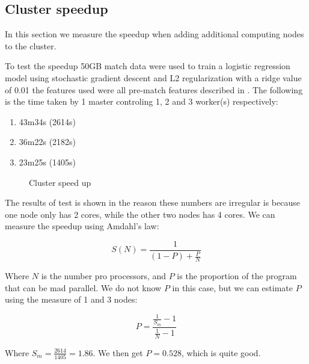 \subsection{Cluster speedup}\label{sec:speedup}
In this section we measure the speedup when adding additional computing nodes to the cluster.

To test the speedup 50GB match data were used to train a logistic regression model using stochastic gradient descent and L2 regularization with a ridge value of 0.01 the features used were all pre-match features described in  . The following is the time taken by 1 master controling 1, 2 and 3 worker(s) respectively:

\begin{enumerate}
    \item 43m34s (2614s)
    \item 36m22s (2182s)
    \item 23m25s (1405s)
\end{enumerate}


\begin{figure}[!htb]
  \centering
   \caption{Cluster speed up}\label{fig:cluster-speedup}
\end{figure}
The results of test is shown in  the reason these numbers are irregular is because one node only has 2 cores, while the other two nodes has 4 cores. We can measure the speedup using Amdahl's law:

\[S(N) = \frac{1}{(1-P)+\frac{P}{N}}\]

Where $N$ is the number pro processors, and $P$ is the proportion of the program that can be mad parallel. We do not know $P$ in this case, but we can estimate $P$ using the measure of 1 and 3 nodes:

\[P = \frac{\frac{1}{S_m}-1}{\frac{1}{N}-1}  \]

Where \( S_m=\frac{2614}{1405} = 1.86 \). We then get $P = 0.528$, which is quite good.